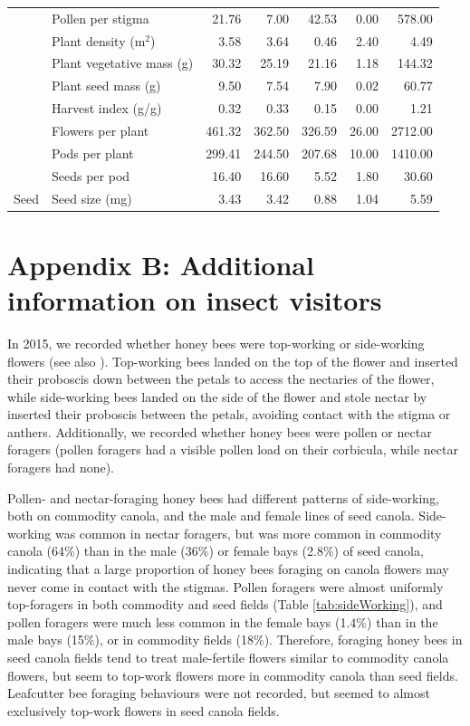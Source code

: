 \documentclass[12pt]{article} %
\begin{document}
\begin{table}[h]
\begin{tabular}{l|l|r|r|r|r|r}
\cline{2-7}
 & Pollen per stigma & 21.76 & 7.00 & 42.53 & 0.00 & 578.00\\
\cline{2-7}
 & Plant density (m$^2$) & 3.58 & 3.64 & 0.46 & 2.40 & 4.49\\
\cline{2-7}
 & Plant vegetative mass (g) & 30.32 & 25.19 & 21.16 & 1.18 & 144.32\\
\cline{2-7}
 & Plant seed mass (g) & 9.50 & 7.54 & 7.90 & 0.02 & 60.77\\
\cline{2-7}
 & Harvest index (g/g) & 0.32 & 0.33 & 0.15 & 0.00 & 1.21\\
\cline{2-7}
 & Flowers per plant & 461.32 & 362.50 & 326.59 & 26.00 & 2712.00\\
\cline{2-7}
 & Pods per plant & 299.41 & 244.50 & 207.68 & 10.00 & 1410.00\\
\cline{2-7}
 & Seeds per pod & 16.40 & 16.60 & 5.52 & 1.80 & 30.60\\
\cline{2-7}
\multirow{-15}{*}{\raggedright\arraybackslash Seed} & Seed size (mg) & 3.43 & 3.42 & 0.88 & 1.04 & 5.59\\
\hline
\end{tabular}
\end{table}

\clearpage

\section*{Appendix B: Additional information on insect visitors}

In 2015, we recorded whether honey bees were top-working or side-working flowers (see also \citealp{free1973, free1983, mohr1988}).
Top-working bees landed on the top of the flower and inserted their proboscis down between the petals to access the nectaries of the flower, while side-working bees landed on the side of the flower and stole nectar by inserted their proboscis between the petals, avoiding contact with the stigma or anthers. 
Additionally, we recorded whether honey bees were pollen or nectar foragers (pollen foragers had a visible pollen load on their corbicula, while nectar foragers had none).

Pollen- and nectar-foraging honey bees had different patterns of side-working, both on commodity canola, and the male and female lines of seed canola.
Side-working was common in nectar foragers, but was more common in commodity canola (64\%) than in the male (36\%) or female bays (2.8\%) of seed canola, indicating that a large proportion of honey bees foraging on canola flowers may never come in contact with the stigmas.
Pollen foragers were almost uniformly top-foragers in both commodity and seed fields (Table \ref{tab:sideWorking}), and pollen foragers were much less common in the female bays (1.4\%) than in the male bays (15\%), or in commodity fields (18\%).
Therefore, foraging honey bees in seed canola fields tend to treat male-fertile flowers similar to commodity canola flowers, but seem to top-work flowers more in commodity canola than seed fields.
Leafcutter bee foraging behaviours were not recorded, but seemed to almost exclusively top-work flowers in seed canola fields.
\end{document}
